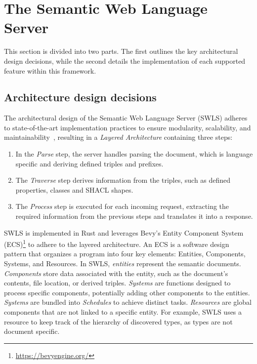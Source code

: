 \section{The Semantic Web Language Server}%
\label{sec:semantic_lsp}

This section is divided into two parts. The first outlines the key architectural design decisions, while the second details the implementation of each supported feature within this framework.

\subsection{Architecture design decisions}

The architectural design of the Semantic Web Language Server (SWLS) adheres to state-of-the-art implementation practices to ensure modularity, scalability, and maintainability~\cite{10.1145/3550355.3552452,10.1145/3563834.3567537,Bour_2018}, resulting in a \textit{Layered Architecture} containing three steps:

\begin{enumerate}
  \item In the \textit{Parse} step, the server handles parsing the document, which is language specific and deriving defined triples and prefixes.

  \item The \textit{Traverse} step derives information from the triples, such as defined properties, classes and SHACL shapes. 

  \item The \textit{Process} step is executed for each incoming request, extracting the required information from the previous steps and translates it into a response.
\end{enumerate}

SWLS is implemented in Rust and leverages Bevy’s Entity Component System (ECS)\footnote{\url{https://bevyengine.org/}} to adhere to the layered architecture.
An ECS is a software design pattern that organizes a program into four key elements: Entities, Components, Systems, and Resources. 
In SWLS, \textit{entities} represent the semantic documents. 
\textit{Components} store data associated with the entity, such as the document's contents, file location, or derived triples. 
\textit{Systems} are functions designed to process specific components, potentially adding other components to the entities.
\textit{Systems} are bundled into \textit{Schedules} to achieve distinct tasks.
\textit{Resources} are global components that are not linked to a specific entity.
For example, SWLS uses a resource to keep track of the hierarchy of discovered types, as types are not document specific.

